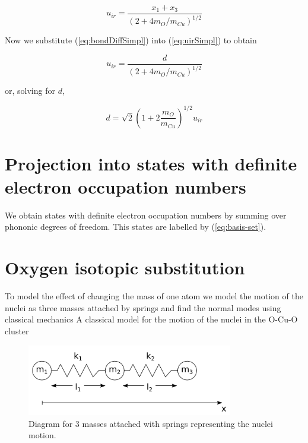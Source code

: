 \begin{equation}\label{eq:uirSimpl}
u_{ir}=\frac{x_1+x_3}{\left( 2+4 m_O/m_{Cu} \right)^{1/2}}
\end{equation}

Now we substitute (\ref{eq:bondDiffSimpl}) into (\ref{eq:uirSimpl}) to obtain

\begin{equation}\label{eq:uirvsd}
u_{ir}=\frac{d}{\left( 2+4 m_O/m_{Cu} \right)^{1/2}}
\end{equation}

or, solving for $d$,

\begin{equation}\label{eq:dvsuir}
d=\sqrt{2}\left(1 + 2\frac{m_O}{m_{Cu}} \right)^{1/2}u_{ir}
\end{equation}


\section{Projection into states with definite electron occupation numbers}

We obtain states with definite electron occupation numbers by summing over phononic degrees of freedom. This states are labelled by (\ref{eq:basis-set}).


\section{Oxygen isotopic substitution}

To model the effect of changing the mass of one atom we model the motion of the nuclei as three masses attached by springs and find the normal modes using classical mechanics A classical model for the motion of the nuclei in the O-Cu-O cluster

\begin{figure}[ht!]
\centering
\includegraphics[width=0.8\textwidth]{images/3-masses-2-springs-linear.png}
\caption{Diagram for 3 masses attached with springs representing the nuclei motion.}
\label{fig:3-mases-2-springs}
\end{figure}

